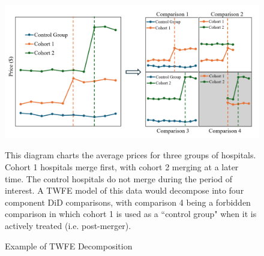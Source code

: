 \documentclass[12pt]{article}
\begin{document}
\begin{figure}[H]
    \centering
    \caption{Example of TWFE Decomposition}
    \includegraphics[width=5in]{Figures/DiD Decomposition Diagram.PNG}
    \label{fig:decomp}
    \vspace{3mm}
    \footnotesize \begin{singlespace*}
        \parbox{5.5in}{This diagram charts the average prices for three groups of hospitals. Cohort 1 hospitals merge first, with cohort 2 merging at a later time. The control hospitals do not merge during the period of interest. A TWFE model of this data would decompose into four component DiD comparisons, with comparison 4 being a forbidden comparison in which cohort 1 is used as a ``control group" when it is actively treated (i.e. post-merger).}
    \end{singlespace*}
\end{figure}
\end{document}
